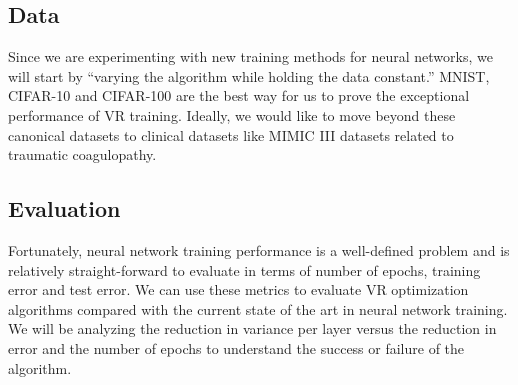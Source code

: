 \documentclass{article} %
\begin{document}

\subsection{Data}
Since we are experimenting with new training methods for neural networks, we will start by ``varying the algorithm while holding the data constant.'' MNIST, CIFAR-10 and CIFAR-100 are the best way for us to prove the exceptional performance of VR training. Ideally, we would like to move beyond these canonical datasets to clinical datasets like MIMIC III \cite{mimiciii} datasets related to traumatic coagulopathy.

\subsection{Evaluation}
Fortunately, neural network training performance is a well-defined problem and is relatively straight-forward to evaluate in terms of number of epochs, training error and test error. We can use these metrics to evaluate VR optimization algorithms compared with the current state of the art in neural network training. We will be analyzing the reduction in variance per layer versus the reduction in error and the number of epochs to understand the success or failure of the algorithm.




\end{document}
